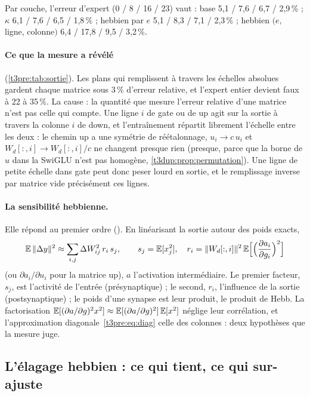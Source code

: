 Par couche, l'erreur d'expert (0 / 8 / 16 / 23) vaut \mes : base 5,1 / 7,6 / 6,7 / 2,9\,\% ; $\kappa$ 6,1 / 7,6 / 6,5 / 1,8\,\% ; hebbien par $e$ 5,1 / 8,3 / 7,1 / 2,3\,\% ; hebbien $(e,$ ligne, colonne$)$ 6,4 / 17,8 / 9,5 / 3,2\,\%.

\paragraph{Ce que la mesure a révélé} (\cref{t3pre:tab:sortie}). Les plans qui remplissent à travers les échelles absolues gardent chaque matrice sous 3\,\% d'erreur relative, et l'expert entier devient faux à 22 à 35\,\%. La cause : la quantité que mesure l'erreur relative d'une matrice n'est pas celle qui compte. Une ligne $i$ de gate ou de up agit sur la sortie à travers la colonne $i$ de down, et l'entraînement répartit librement l'échelle entre les deux : le chemin up a une symétrie de réétalonnage, $u_i \to c\,u_i$ et $W_d[:, i] \to W_d[:, i]/c$ ne changent presque rien (presque, parce que la borne de $u$ dans la SwiGLU n'est pas homogène, \cref{t3dup:prop:permutation}). Une ligne de petite échelle dans gate peut donc peser lourd en sortie, et le remplissage inverse par matrice vide précisément ces lignes.

\paragraph{La sensibilité hebbienne.} Elle répond au premier ordre (). En linéarisant la sortie autour des poids exacts,
\begin{equation}\label{t3pre:eq:hebb}
\mathbb{E}\,\|\Delta y\|^2 \approx \sum_{i,j} \Delta W_{ij}^2\, r_i\, s_j, \qquad s_j = \mathbb{E}[x_j^2], \quad r_i = \|W_d[:, i]\|^2\, \mathbb{E}\Bigl[\Bigl(\frac{\partial a_i}{\partial g_i}\Bigr)^2\Bigr]
\end{equation}
(ou $\partial a_i / \partial u_i$ pour la matrice up), $a$ l'activation intermédiaire. Le premier facteur, $s_j$, est l'activité de l'entrée (présynaptique) ; le second, $r_i$, l'influence de la sortie (postsynaptique) ; le poids d'une synapse est leur produit, le produit de Hebb. La factorisation $\mathbb{E}[(\partial a/\partial g)^2 x^2] \approx \mathbb{E}[(\partial a/\partial g)^2]\,\mathbb{E}[x^2]$ néglige leur corrélation, et l'approximation diagonale~\eqref{t3pre:eq:diag} celle des colonnes : deux hypothèses que la mesure juge.

\subsection{L'élagage hebbien : ce qui tient, ce qui sur-ajuste}

